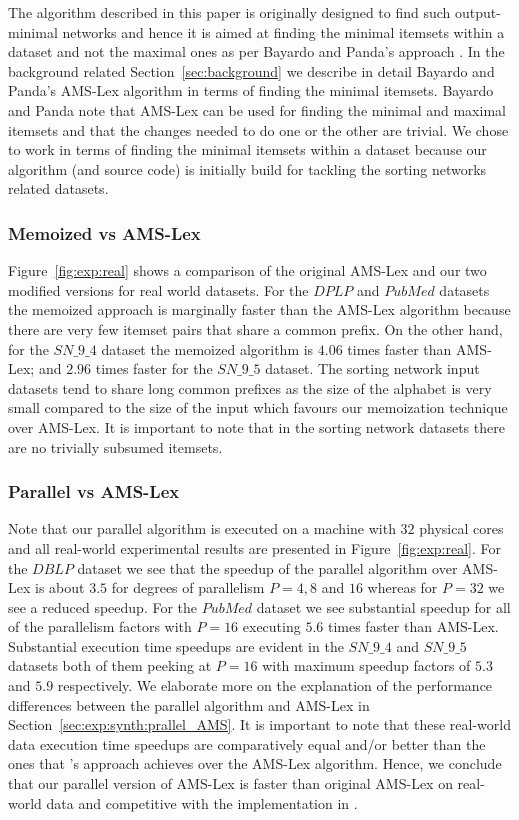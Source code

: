 \documentclass[13pt,a4paper]{article}
\begin{document}
The algorithm described in this paper is originally designed to find such output-minimal networks and hence it is aimed at finding the minimal itemsets within a dataset and not the maximal ones as per Bayardo and Panda's approach \cite{BayardoPanda11}. In the background related Section~\ref{sec:background} we describe in detail Bayardo and Panda's AMS-Lex algorithm in terms of finding the minimal itemsets. Bayardo and Panda note that AMS-Lex can be used for finding the minimal and maximal itemsets and that the changes needed to do one or the other are trivial. We chose to work in terms of finding the minimal itemsets within a dataset because our algorithm (and source code) is initially build for tackling the sorting networks related datasets.


\subsubsection{Memoized vs AMS-Lex}

Figure~\ref{fig:exp:real} shows a comparison of the original AMS-Lex and our two modified versions for real world datasets. For the $DPLP$ and $PubMed$ datasets the memoized approach is marginally faster than the AMS-Lex algorithm because there are very few itemset pairs that share a common prefix. On the other hand, for the $SN\_9\_4$ dataset the memoized algorithm is $4.06$ times faster than AMS-Lex; and $2.96$ times faster for the $SN\_9\_5$ dataset. The sorting network input datasets tend to share long common prefixes as the size of the alphabet is very small compared to the size of the input which favours our memoization technique over AMS-Lex. It is important to note that in the sorting network datasets there are no trivially subsumed itemsets.

\subsubsection{Parallel vs AMS-Lex}

Note that our parallel algorithm is executed on a machine with $32$ physical cores and all real-world experimental results are presented in Figure~\ref{fig:exp:real}. For the $DBLP$ dataset we see that the speedup of the parallel algorithm over AMS-Lex is about $3.5$ for degrees of parallelism $P = 4, 8$ and $16$ whereas for $P=32$ we see a reduced speedup. For the $PubMed$ dataset we see substantial speedup for all of the parallelism factors with $P=16$ executing $5.6$ times faster than AMS-Lex. Substantial execution time speedups are evident in the $SN\_9\_4$ and $SN\_9\_5$ datasets both of them peeking at $P=16$ with maximum speedup factors of $5.3$ and $5.9$ respectively. We elaborate more on the explanation of the performance differences between the parallel algorithm and AMS-Lex in Section~\ref{sec:exp:synth:prallel_AMS}. It is important to note that these real-world data execution time speedups are comparatively equal and/or better than the ones that \cite{Fort+13}'s approach achieves over the AMS-Lex algorithm. Hence, we conclude that our parallel version of AMS-Lex is faster than original AMS-Lex on real-world data and competitive with the implementation in \cite{Fort+13}.
\end{document}
